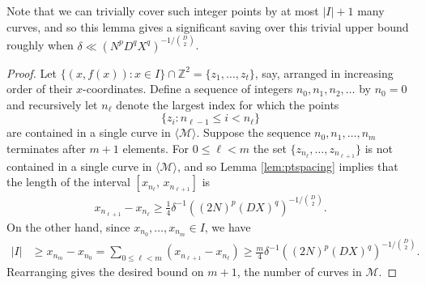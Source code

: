 \documentclass[12pt]{amsart}
\newcommand{\Z}{{\mathbb Z}}
\newcommand{\1}{{\mathbf 1}}
\theoremstyle{remark}
\theoremstyle{definition}
\begin{document}
Note that we can trivially cover such integer points by at most $\lvert I\rvert+1$ many curves, and so this lemma gives a significant saving over this trivial upper bound roughly when $\delta\ll \left(N^pD^qX^q\right)^{-1/\binom{D}{2}}$.

\begin{proof}
Let $\{(x,f(x)) : x\in I\}\cap \Z^2=\{z_1,\ldots,z_t\}$, say, arranged in increasing order of their $x$-coordinates. 
Define a sequence of integers $n_0,n_1,n_2,\ldots$ by $n_0=0$ and recursively let $n_\ell$ denote the largest index for which the points
\[\{z_i : n_{\ell-1} \le i < n_{\ell}\}\]
are contained in a single curve in $\langle \mathcal{M}\rangle$. Suppose the sequence $n_0,n_1,\ldots,n_m$ terminates after $m+1$ elements. For $0\leq \ell<m$ the set $\{z_{n_{\ell}},\ldots,z_{n_{\ell+1}}\}$ is not contained in a single curve in $\langle \mathcal{M}\rangle$, and so Lemma \ref{lem:ptspacing} implies that the length of the interval $[x_{n_\ell},\,x_{n_{\ell+1}}]$ is 
\begin{align*}
x_{n_{\ell+1}} - x_{n_\ell} \ge \tfrac{1}{4}\delta^{-1}\left((2N)^p(DX)^q\right)^{-1/\binom{D}{2}}.
\end{align*}
On the other hand, since $x_{n_0},\ldots, x_{n_m}\in I$, we have
\begin{align*}
|I| & \ge x_{n_m} - x_{n_0} = \sum_{0\leq \ell<m}(x_{n_{\ell+1}} - x_{n_\ell})
\ge \frac{m}{4}\delta^{-1}\left((2N)^p(DX)^q\right)^{-1/\binom{D}{2}}.
\end{align*}
Rearranging gives the desired bound on $m+1$, the number of curves in $\mathcal M$.
\end{proof}
\end{document}
